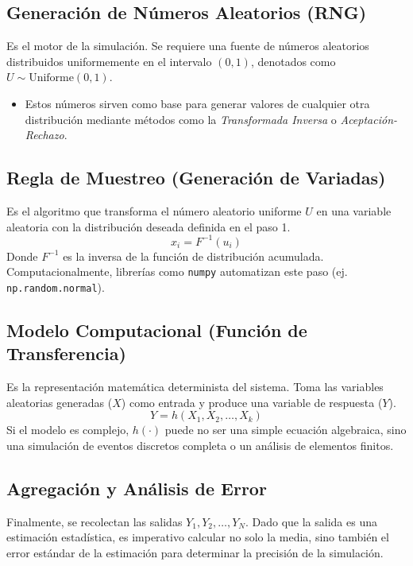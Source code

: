 \documentclass[11pt, letterpaper]{article}
\begin{document}
\subsection{Generación de Números Aleatorios (RNG)}
Es el motor de la simulación. Se requiere una fuente de números aleatorios distribuidos uniformemente en el intervalo $(0, 1)$, denotados como $U \sim \text{Uniforme}(0,1)$. 
\begin{itemize}
    \item Estos números  sirven como base para generar valores de cualquier otra distribución mediante métodos como la \textit{Transformada Inversa} o \textit{Aceptación-Rechazo}.
\end{itemize}

\subsection{Regla de Muestreo (Generación de Variadas)}
Es el algoritmo que transforma el número aleatorio uniforme $U$ en una variable aleatoria con la distribución deseada definida en el paso 1.
\begin{equation}
    x_i = F^{-1}(u_i)
\end{equation}
Donde $F^{-1}$ es la inversa de la función de distribución acumulada. Computacionalmente, librerías como \texttt{numpy} automatizan este paso (ej. \texttt{np.random.normal}).

\subsection{Modelo Computacional (Función de Transferencia)}
Es la representación matemática determinista del sistema. Toma las variables aleatorias generadas ($X$) como entrada y produce una variable de respuesta ($Y$).
\begin{equation}
    Y = h(X_1, X_2, \dots, X_k)
\end{equation}
Si el modelo es complejo, $h(\cdot)$ puede no ser una simple ecuación algebraica, sino una simulación de eventos discretos completa o un análisis de elementos finitos.

\subsection{Agregación y Análisis de Error}
Finalmente, se recolectan las salidas $Y_1, Y_2, \dots, Y_N$. Dado que la salida es una estimación estadística, es imperativo calcular no solo la media, sino también el error estándar de la estimación para determinar la precisión de la simulación.
\end{document}
